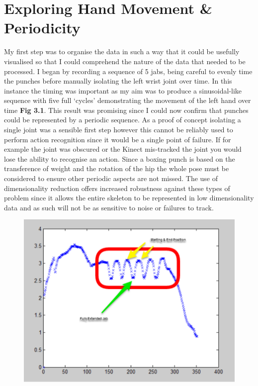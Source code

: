 \section{Exploring Hand Movement \& Periodicity}
My first step was to organise the data in such a way that it could be usefully visualised so that I could comprehend the nature of the data that needed to be processed. I began by recording a sequence of 5 jabs, being careful to evenly time the punches before manually isolating the left wrist joint over time. In this instance the timing was important as my aim was to produce a sinusoidal-like sequence with five full `cycles' demonstrating the movement of the left hand over time {\bf Fig 3.1}.\newline
This result was promising since I could now confirm that punches could be represented by a periodic sequence. As a proof of concept isolating a single joint was a sensible first step however this cannot be reliably used to perform action recognition since it would be a single point of failure.  
If for example the joint was obscured or the Kinect mis-tracked the joint you would lose the ability to recognise an action. Since a boxing punch is based on the transference of weight and the rotation of the hip the whole pose must be considered to ensure other periodic aspects are not missed.
The use of dimensionality reduction offers increased robustness against these types of problem since it allows the entire skeleton to be represented in low dimensionality data and as such will not be as sensitive to noise or failures to track. 

\begin{figure}[h]
    \centering
    \includegraphics[height=0.25\textheight]{fig04/lwrist.pdf}
\end{figure}

